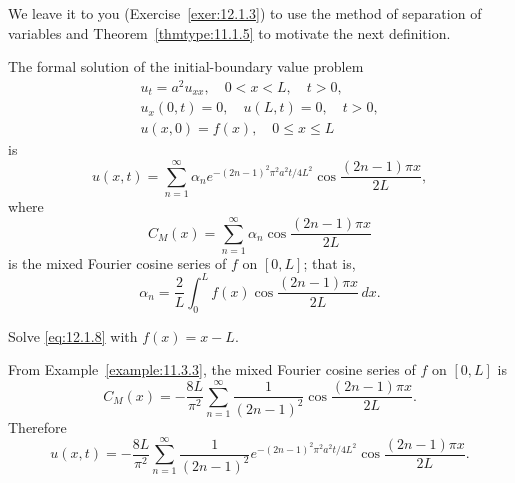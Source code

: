 We leave it to you (Exercise~\ref{exer:12.1.3}) to use the method of separation of variables and
Theorem~\ref{thmtype:11.1.5} to motivate the next definition.

\begin{definition}
  \color{blue}
  \label{thmtype:12.1.5} \rm The formal solution of the initial-boundary value problem
  \begin{equation}
    \label{eq:12.1.8}
    \begin{array}{c}
      u_{t}=a^{2}u_{xx},\quad0<x<L,\quad t>0, \\
      u_{x}(0,t)=0,\quad u(L,t)=0,\quad t>0,  \\
      u(x,0)=f(x),\quad0\le x\le L
    \end{array}
  \end{equation}
  is
  \[
    u(x,t)=\sum_{n=1}^{\infty}\alpha_{n}e^{-(2n-1)^{2}\pi^{2}a^{2}t/4L^{2}}\cos\frac{(2n-1)\pi x}{2L},
  \]
  where
  \[
    C_{M}(x)=\sum_{n=1}^{\infty}\alpha_{n}\cos\frac{(2n-1)\pi x}{2L}
  \]
  is the mixed Fourier cosine series of $f$ on $[0,L]$; that is,
  \[
    \alpha_{n}=\frac{2}{L}\int_{0}^{L}f(x)\cos\frac{(2n-1)\pi x}{2L}\,dx.
  \]
\end{definition}

\begin{example}
  \label{example:12.1.4} \rm Solve \eqref{eq:12.1.8} with $f(x)=x-L$.
\end{example}

\begin{examplesolution}
\solution From Example~\ref{example:11.3.3}, the mixed Fourier cosine series of $f$ on $[0,L]$ is
\[
  C_{M}(x)=-\frac{8L}{\pi^{2}}\sum_{n=1}^{\infty}\frac{1}{(2n-1)^{2}}\cos\frac{(2n-1)\pi x}{2L}.
\]
Therefore
\[
  u(x,t)=-\frac{8L}{\pi^{2}}\sum_{n=1}^{\infty}\frac{1}{(2n-1)^{2}}e^{-(2n-1)^{2}\pi^{2}a^{2}t/4L^{2}}\cos\frac{(2n-1)\pi x}{2L}.
\]
\end{examplesolution}


